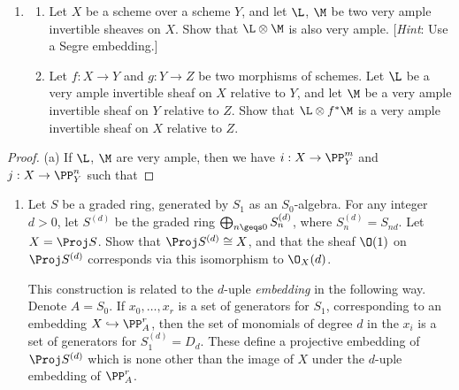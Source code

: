 \documentclass[12pt]{amsart}
\begin{document}
\begin{enumerate}
  \item[5.12.] {
      \begin{enumerate}
        \item Let $X$ be a scheme over a scheme $Y$, and let $\L$, $\M$ be two very ample invertible sheaves on $X$.
          Show that $\L\otimes \M$ is also very ample.
          [\emph{Hint}: Use a Segre embedding.]
        \item Let $f:X\to Y$ and $g:Y\to Z$ be two morphisms of schemes.
          Let $\L$ be a very ample invertible sheaf on $X$ relative to $Y$, and let $\M$ be a very ample invertible sheaf on $Y$ relative to $Z$.
          Show that $\L\otimes f^*\M$ is a very ample invertible sheaf on $X$ relative to $Z$.
      \end{enumerate}
    }
\end{enumerate}

\begin{proof}
  (a) If $\L$, $\M$ are very ample, then we have $i:X\to \PP_Y^m$ and $j:X\to \PP_Y^n$ such that
\end{proof}

\begin{enumerate}
  \item[5.13.] {
      Let $S$ be a graded ring, generated by $S_1$ as an $S_0$-algebra.
      For any integer $d>0$, let $S^{(d)}$ be the graded ring $\bigoplus_{n\geqs 0}S_n^{(d)}$, where $S_n^{(d)}=S_{nd}$.
      Let $X=\Proj S$.
      Show that $\Proj S^{(d)}\cong X$, and that the sheaf $\O(1)$ on $\Proj S^{(d)}$ corresponds via this isomorphism to $\O_X(d)$.

      This construction is related to the $d$-uple \emph{embedding} in the following way.
      Denote $A=S_0$.
      If $x_0,\ldots, x_r$ is a set of generators for $S_1$, corresponding to an embedding $X\hookrightarrow \PP_A^r$, then the set of monomials of degree $d$ in the $x_i$ is a set of generators for $S_1^{(d)}=D_d$.
      These define a projective embedding of $\Proj S^{(d)}$ which is none other than the image of $X$ under the $d$-uple embedding of $\PP_A^r$.
    }
\end{enumerate}
\end{document}
